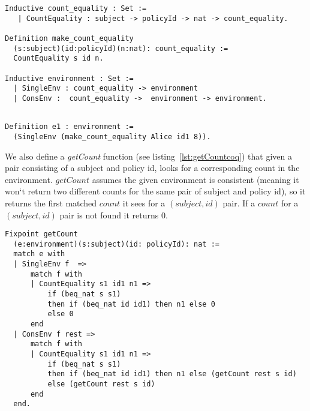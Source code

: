 \begin{lstlisting}
Inductive count_equality : Set := 
   | CountEquality : subject -> policyId -> nat -> count_equality.

Definition make_count_equality
  (s:subject)(id:policyId)(n:nat): count_equality :=
  CountEquality s id n.
  
Inductive environment : Set := 
  | SingleEnv : count_equality -> environment
  | ConsEnv :  count_equality ->  environment -> environment.

\end{lstlisting}

\begin{minipage}[c]{0.95\textwidth}
\begin{lstlisting}

Definition e1 : environment := 
  (SingleEnv (make_count_equality Alice id1 8)).

\end{lstlisting}
\end{minipage}
  

We also define a \emph{getCount} function (see listing~\ref{lst:getCountcoq}) that given a pair consisting of a subject and policy id, looks for a corresponding count in the environment. $getCount$ assumes the given environment is consistent (meaning it won`t return two different counts for the same pair of subject and policy id), so it returns the first matched $count$ it sees for a $(subject, id)$ pair. If a $count$ for a $(subject, id)$ pair is not found it returns 0. 


\begin{minipage}[c]{0.95\textwidth}
\begin{lstlisting}
Fixpoint getCount 
  (e:environment)(s:subject)(id: policyId): nat :=
  match e with
  | SingleEnv f  => 
      match f with 
	  | CountEquality s1 id1 n1 => 
          if (beq_nat s s1) 
          then if (beq_nat id id1) then n1 else 0 
          else 0  
      end			
  | ConsEnv f rest =>
      match f with 
	  | CountEquality s1 id1 n1 => 
          if (beq_nat s s1)
          then if (beq_nat id id1) then n1 else (getCount rest s id)  
          else (getCount rest s id)
      end
  end.
\end{lstlisting}
\end{minipage}

